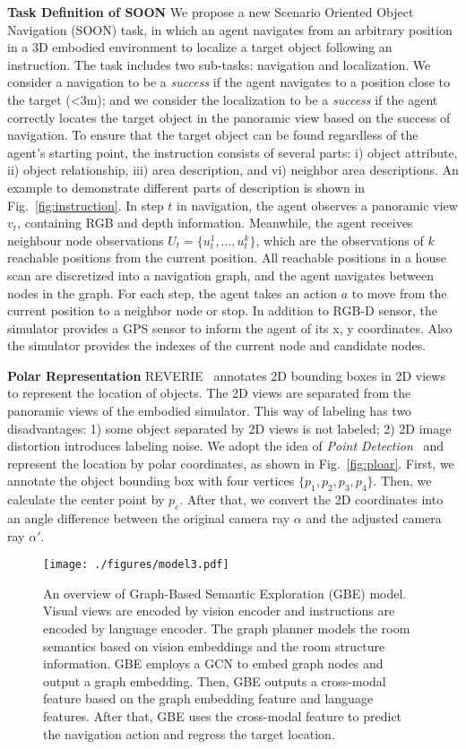 \documentclass[final]{cvpr}
\begin{document}
\noindent\textbf{Task Definition of SOON} 
We propose a new Scenario Oriented Object Navigation (SOON) task, in which an agent navigates from an arbitrary position in a 3D embodied environment to localize a target object following an instruction. 
The task includes two sub-tasks: navigation and localization. 
We consider a navigation to be a \emph{success} if the agent navigates to a position close to the target (<3m);
and we consider the localization to be a \emph{success} if the agent correctly locates the target object in the panoramic view based on the success of navigation. 
To ensure that the target object can be found regardless of the agent's starting point, the instruction consists of several parts: i) object attribute, ii) object relationship, iii) area description, and vi) neighbor area descriptions. 
An example to demonstrate different parts of description is shown in Fig.~\ref{fig:instruction}. 
In step $t$ in navigation, the agent observes a panoramic view $v_t$, containing RGB and depth information. 
Meanwhile, the agent receives neighbour node observations $U_t=\{u^1_t,...,u^k_t\}$, which are the observations of $k$ reachable positions from the current position. 
All reachable positions in a house scan are discretized into a navigation graph, and the agent navigates between nodes in the graph. 
For each step, the agent takes an action $a$ to move from the current position to a neighbor node or stop. 
In addition to RGB-D sensor, the simulator provides a GPS sensor to inform the agent of its x, y coordinates. Also the simulator provides the indexes of the current node and candidate nodes. 



\noindent\textbf{Polar Representation} 
\label{sec:polar}
REVERIE~\cite{qi2019reverie} annotates 2D bounding boxes in 2D views to represent the location of objects. The 2D views are separated from the panoramic views of the embodied simulator. 
This way of labeling has two disadvantages: 1) some object separated by 2D views is not labeled; 2) 2D image distortion introduces labeling noise. 
We adopt the idea of \emph{Point Detection}~\cite{oquab2015object, zhu2017soft} and represent the location by polar coordinates, as shown in Fig.~\ref{fig:ploar}. 
First, we annotate the object bounding box with four vertices $\{ p_1, p_2, p_3, p_4 \}$. Then, we calculate the center point by $p_c$. After that, we convert the 2D coordinates into an angle difference between the original camera ray $\alpha$ and the adjusted camera ray $\alpha{}'$. 
\begin{figure*}[t]
\centering
\texttt{[image: ./figures/model3.pdf]}
\caption{
An overview of Graph-Based Semantic Exploration (GBE) model. 
Visual views are encoded by vision encoder and instructions are encoded by language encoder. The graph planner models the room semantics based on vision embeddings and the room structure information. 
GBE employs a GCN to embed graph nodes and output a graph embedding. 
Then, GBE outputs a cross-modal feature based on the graph embedding feature and language features. 
After that, GBE uses the cross-modal feature to predict the navigation action and regress the target location. 
}
 \vspace{-7pt}
\label{fig:model}
\end{figure*}
\end{document}
